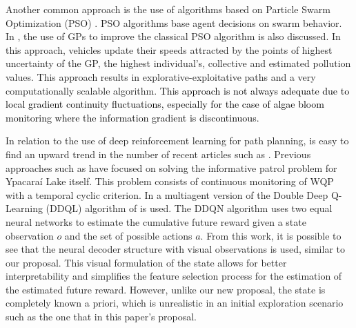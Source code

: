 \documentclass[journal]{IEEEtran}
\newcommand\changes[1]{\textcolor{black}{#1}}
\begin{document}
Another common approach is the use of algorithms based on Particle Swarm Optimization (PSO) \cite{kathen_informative_2021}. PSO algorithms base agent decisions on swarm behavior. In \cite{kathen_informative_2021}, the use of GPs to improve the classical PSO algorithm is also discussed. In this approach, vehicles update their speeds attracted by the points of highest uncertainty of the GP, the highest individual's, collective and estimated pollution values. This approach results in explorative-exploitative paths and a very computationally scalable algorithm. %
\changes{This approach is not always adequate due to local gradient continuity fluctuations, especially for the case of algae bloom monitoring where the information gradient is discontinuous.} 


In relation to the use of deep reinforcement learning for path planning, is easy to find an upward trend in the number of recent articles such as \cite{yanes_multiagent_2021}. Previous approaches such as \cite{yanes_deep_2020} have focused on solving the informative patrol problem for Ypacaraí Lake itself. This problem consists of continuous monitoring of WQP with a temporal cyclic criterion. In \cite{yanes_multiagent_2021} a multiagent version of the Double Deep Q-Learning (DDQL) algorithm of \cite{mnih_human-level_2015} is used. The DDQN algorithm uses two equal neural networks to estimate the cumulative future reward given a state observation $o$ and the set of possible actions $a$. From this work, it is possible to see that the neural decoder structure with visual observations is used, similar to our proposal. This visual formulation of the state allows for better interpretability and simplifies the feature selection process for the estimation of the estimated future reward. However, unlike our new proposal, the state is completely known a priori, which is unrealistic in an initial exploration scenario such as the one that in this paper's proposal. 
\end{document}
